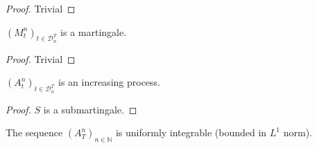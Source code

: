 \begin{proof}
  Trivial
\end{proof}


\begin{lemma}\label{lem:Doob_Meyer_Finite_Martingale}
  $(M^n_t)_{t\in\mathcal{D}_n^T}$ is a martingale.
\end{lemma}

\begin{proof}
  Trivial
\end{proof}


\begin{lemma}\label{lem:Predict_Part_Increasing}
  $(A^n_t)_{t\in\mathcal{D}_n^T}$ is an increasing process.
\end{lemma}

\begin{proof}
  $S$ is a submartingale.
\end{proof}


\begin{lemma}\label{lem:A_uniform_integrable}
  The sequence $(A^n_T)_{n\in\mathbb{N}}$ is uniformly integrable (bounded in $L^1$ norm).
\end{lemma}


